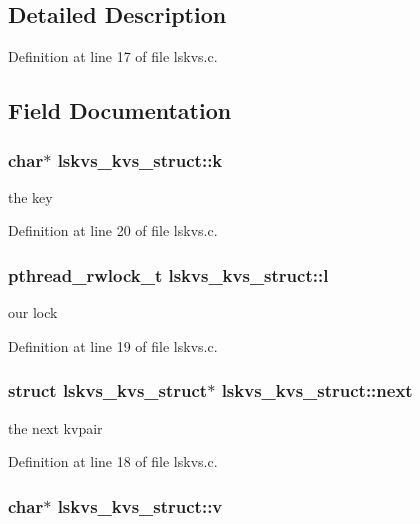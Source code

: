 \subsection{Detailed Description}


Definition at line 17 of file lskvs.c.

\subsection{Field Documentation}
\hypertarget{structlskvs__kvs__struct_afaaab7729ce9dbabd8f3e2c502a8e4c5}{
\subsubsection[{k}]{\setlength{\rightskip}{0pt plus 5cm}char$\ast$ {\bf lskvs\_\-kvs\_\-struct::k}}}
\label{structlskvs__kvs__struct_afaaab7729ce9dbabd8f3e2c502a8e4c5}


the key 

Definition at line 20 of file lskvs.c.\hypertarget{structlskvs__kvs__struct_a45129c7f3d0bb2efc83b8a0d7ea2d814}{
\subsubsection[{l}]{\setlength{\rightskip}{0pt plus 5cm}pthread\_\-rwlock\_\-t {\bf lskvs\_\-kvs\_\-struct::l}}}
\label{structlskvs__kvs__struct_a45129c7f3d0bb2efc83b8a0d7ea2d814}


our lock 

Definition at line 19 of file lskvs.c.\hypertarget{structlskvs__kvs__struct_a6302f184418962708bd1efe3320d4347}{
\subsubsection[{next}]{\setlength{\rightskip}{0pt plus 5cm}struct {\bf lskvs\_\-kvs\_\-struct}$\ast$ {\bf lskvs\_\-kvs\_\-struct::next}}}
\label{structlskvs__kvs__struct_a6302f184418962708bd1efe3320d4347}


the next kvpair 

Definition at line 18 of file lskvs.c.\hypertarget{structlskvs__kvs__struct_a27a0ae4415b6d65c8a9f9fac11c130f9}{
\subsubsection[{v}]{\setlength{\rightskip}{0pt plus 5cm}char$\ast$ {\bf lskvs\_\-kvs\_\-struct::v}}}
\label{structlskvs__kvs__struct_a27a0ae4415b6d65c8a9f9fac11c130f9}


